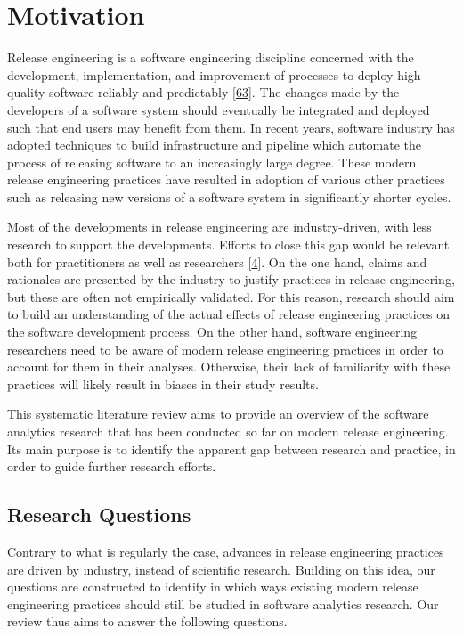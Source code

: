 \documentclass[]{book}
\begin{document}
\section{Motivation}\label{motivation-4}

Release engineering is a software engineering discipline concerned with
the development, implementation, and improvement of processes to deploy
high-quality software reliably and predictably
{[}\protect\hyperlink{ref-dyck2015a}{63}{]}. The changes made by the
developers of a software system should eventually be integrated and
deployed such that end users may benefit from them. In recent years,
software industry has adopted techniques to build infrastructure and
pipeline which automate the process of releasing software to an
increasingly large degree. These modern release engineering practices
have resulted in adoption of various other practices such as releasing
new versions of a software system in significantly shorter cycles.

Most of the developments in release engineering are industry-driven,
with less research to support the developments. Efforts to close this
gap would be relevant both for practitioners as well as researchers
{[}\protect\hyperlink{ref-adams2016a}{4}{]}. On the one hand, claims and
rationales are presented by the industry to justify practices in release
engineering, but these are often not empirically validated. For this
reason, research should aim to build an understanding of the actual
effects of release engineering practices on the software development
process. On the other hand, software engineering researchers need to be
aware of modern release engineering practices in order to account for
them in their analyses. Otherwise, their lack of familiarity with these
practices will likely result in biases in their study results.

This systematic literature review aims to provide an overview of the
software analytics research that has been conducted so far on modern
release engineering. Its main purpose is to identify the apparent gap
between research and practice, in order to guide further research
efforts.

\hypertarget{research-questions-1}{\subsection{Research
Questions}\label{research-questions-1}}

Contrary to what is regularly the case, advances in release engineering
practices are driven by industry, instead of scientific research.
Building on this idea, our questions are constructed to identify in
which ways existing modern release engineering practices should still be
studied in software analytics research. Our review thus aims to answer
the following questions.
\end{document}
